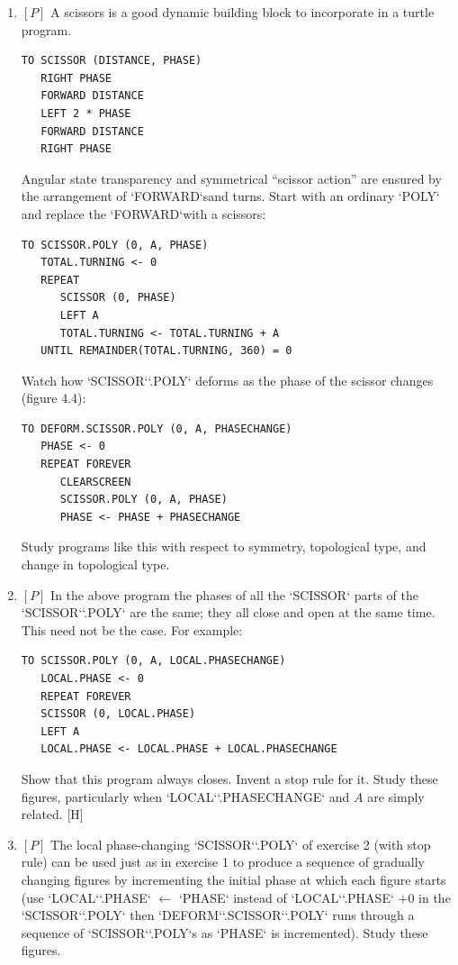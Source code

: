 \documentclass{book}
\begin{document}
\begin{enumerate}
\item $[P]$ A scissors is a good dynamic building block to incorporate in a
turtle program.
\begin{verbatim}
TO SCISSOR (DISTANCE, PHASE)
   RIGHT PHASE
   FORWARD DISTANCE
   LEFT 2 * PHASE
   FORWARD DISTANCE
   RIGHT PHASE
\end{verbatim}
Angular state transparency and symmetrical ``scissor action'' are ensured
by the arrangement of \textsc{`FORWARD`}sand turns. Start with an ordinary \textsc{`POLY`}
and replace the \textsc{`FORWARD`}with a scissors:

\begin{verbatim}
TO SCISSOR.POLY (0, A, PHASE)
   TOTAL.TURNING <- 0
   REPEAT
      SCISSOR (0, PHASE)
      LEFT A
      TOTAL.TURNING <- TOTAL.TURNING + A
   UNTIL REMAINDER(TOTAL.TURNING, 360) = 0
\end{verbatim}
Watch how \textsc{`SCISSOR`}\textsc{`.POLY`} deforms as the phase of the scissor changes
(figure 4.4):

\begin{verbatim}
TO DEFORM.SCISSOR.POLY (0, A, PHASECHANGE)
   PHASE <- 0
   REPEAT FOREVER
      CLEARSCREEN
      SCISSOR.POLY (0, A, PHASE)
      PHASE <- PHASE + PHASECHANGE
\end{verbatim}
Study programs like this with respect to symmetry, topological type,
and change in topological type.
\item $[P]$ In the above program the phases of all the \textsc{`SCISSOR`} parts of the
\textsc{`SCISSOR`}\textsc{`.POLY`} are the same; they all close and open at the same time.
This need not be the case. For example:

\begin{verbatim}
TO SCISSOR.POLY (0, A, LOCAL.PHASECHANGE)
   LOCAL.PHASE <- 0
   REPEAT FOREVER
   SCISSOR (0, LOCAL.PHASE)
   LEFT A
   LOCAL.PHASE <- LOCAL.PHASE + LOCAL.PHASECHANGE
\end{verbatim}
Show that this program always closes. Invent a stop rule for it. Study
these figures, particularly when \textsc{`LOCAL`}\textsc{`.PHASECHANGE`} and $A$ are simply
related. [H]
\item $[P]$ The local phase-changing \textsc{`SCISSOR`}\textsc{`.POLY`} of exercise 2 (with stop
rule) can be used just as in exercise 1 to produce a sequence of gradually
changing figures by incrementing the initial phase at which each figure
starts (use \textsc{`LOCAL`}\textsc{`.PHASE`} $\leftarrow$ \textsc{`PHASE`} instead of \textsc{`LOCAL`}\textsc{`.PHASE`} $+ 0$ in the
\textsc{`SCISSOR`}\textsc{`.POLY`} then \textsc{`DEFORM`}\textsc{`.SCISSOR`}\textsc{`.POLY`} runs through a sequence of
\textsc{`SCISSOR`}\textsc{`.POLY`}s as \textsc{`PHASE`} is incremented). Study these figures.


\end{enumerate}
\end{document}
